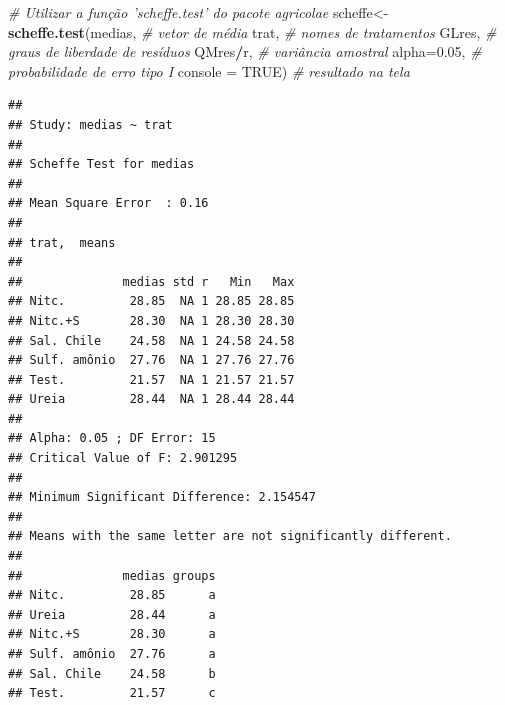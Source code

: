 \documentclass[
]{book}
\newenvironment{Shaded}{\begin{snugshade}}{\end{snugshade}}
\newcommand{\CommentTok}[1]{\textcolor[rgb]{0.56,0.35,0.01}{\textit{#1}}}
\newcommand{\DataTypeTok}[1]{\textcolor[rgb]{0.13,0.29,0.53}{#1}}
\newcommand{\DecValTok}[1]{\textcolor[rgb]{0.00,0.00,0.81}{#1}}
\newcommand{\FloatTok}[1]{\textcolor[rgb]{0.00,0.00,0.81}{#1}}
\newcommand{\KeywordTok}[1]{\textcolor[rgb]{0.13,0.29,0.53}{\textbf{#1}}}
\newcommand{\NormalTok}[1]{#1}
\newcommand{\OperatorTok}[1]{\textcolor[rgb]{0.81,0.36,0.00}{\textbf{#1}}}
\newcommand{\OtherTok}[1]{\textcolor[rgb]{0.56,0.35,0.01}{#1}}
\newcommand{\StringTok}[1]{\textcolor[rgb]{0.31,0.60,0.02}{#1}}
\begin{document}
\begin{Shaded}
\begin{Highlighting}[]
\CommentTok{# Utilizar a função 'scheffe.test' do pacote agricolae}
\NormalTok{scheffe<-}\KeywordTok{scheffe.test}\NormalTok{(medias, }\CommentTok{# vetor de média}
\NormalTok{                trat, }\CommentTok{# nomes de tratamentos}
\NormalTok{                GLres, }\CommentTok{# graus de liberdade de resíduos}
\NormalTok{                QMres}\OperatorTok{/}\NormalTok{r, }\CommentTok{# variância amostral}
                \DataTypeTok{alpha=}\FloatTok{0.05}\NormalTok{, }\CommentTok{# probabilidade de erro tipo I}
                \DataTypeTok{console =} \OtherTok{TRUE}\NormalTok{) }\CommentTok{# resultado na tela}
\end{Highlighting}
\end{Shaded}

\begin{verbatim}
## 
## Study: medias ~ trat
## 
## Scheffe Test for medias 
## 
## Mean Square Error  : 0.16 
## 
## trat,  means
## 
##              medias std r   Min   Max
## Nitc.         28.85  NA 1 28.85 28.85
## Nitc.+S       28.30  NA 1 28.30 28.30
## Sal. Chile    24.58  NA 1 24.58 24.58
## Sulf. amônio  27.76  NA 1 27.76 27.76
## Test.         21.57  NA 1 21.57 21.57
## Ureia         28.44  NA 1 28.44 28.44
## 
## Alpha: 0.05 ; DF Error: 15 
## Critical Value of F: 2.901295 
## 
## Minimum Significant Difference: 2.154547 
## 
## Means with the same letter are not significantly different.
## 
##              medias groups
## Nitc.         28.85      a
## Ureia         28.44      a
## Nitc.+S       28.30      a
## Sulf. amônio  27.76      a
## Sal. Chile    24.58      b
## Test.         21.57      c
\end{verbatim}

\begin{Shaded}
\end{Shaded}
\end{document}
